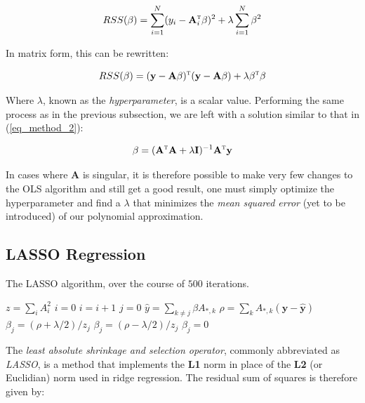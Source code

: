 \documentclass[a4paper,10pt,english]{article}
\begin{document}
\begin{equation*}
RSS(\beta) = \sum_{i=1}^N (y_i - \mathbf{A}_i^\textsc{t} \beta)^2 + \lambda \sum_{i=1}^N \beta^2
\end{equation*}

In matrix form, this can be rewritten:	

\begin{equation*}
RSS(\beta) = (\mathbf{y} - \mathbf{A} \beta)^\textsc{t}(\mathbf{y} - \mathbf{A} \beta) + \lambda \beta^\textsc{t} \beta
\end{equation*}

Where $\lambda$, known as the \textit{hyperparameter}, is a scalar value. Performing the same process as in the previous subsection, we are left with a solution similar to that in (\ref{eq_method_2}):

\begin{equation}
\label{eq_method_3}
\beta = (\mathbf{A}^\textsc{t} \mathbf{A} + \lambda \mathbf{I}) ^{-1} \mathbf{A}^\textsc{t} \mathbf{y}
\end{equation}

In cases where $\mathbf{A}$ is singular, it is therefore possible to make very few changes to the OLS algorithm and still get a good result, one must simply optimize the hyperparameter and find a $\lambda$ that minimizes the \textit{mean squared error} (yet to be introduced) of our polynomial approximation.

\subsection*{LASSO Regression}

\begin{algorithm}[H]
	\caption{The LASSO algorithm, over the course of $500$ iterations.}
	\begin{algorithmic}[1]
		\State $z = \sum_i A_i^2$
		\State $i = 0$
		\State $i = i + 1$
		\State $j = 0$
		\State $\hat{y} = \sum_{k \neq j} \beta A_{*,k}$
		\State $\rho = \sum_k A_{*,k} (\mathbf{y} - \mathbf{\hat{y}})$
		\State $\beta_j = (\rho + \lambda/2)/z_j$
		\State $\beta_j = (\rho - \lambda/2)/z_j$
		\Else
		\State $\beta_j = 0$
		\EndIf
		\EndWhile		
		\EndWhile
	\end{algorithmic}
\end{algorithm}


The \textit{least absolute shrinkage and selection operator}, commonly abbreviated as \textit{LASSO}, is a method that implements the \textbf{L1} norm in place of the \textbf{L2} (or Euclidian) norm used in ridge regression.  The residual sum of squares is therefore given by:
\end{document}
